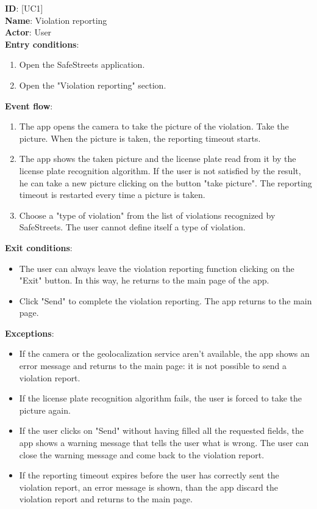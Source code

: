 \documentclass{article}
\newcommand\usecase[1]{ [UC#1] }
\begin{document}
				\textbf{ID}: \usecase{1} \\
				\textbf{Name}:   Violation reporting\\
				\textbf{Actor}:  User\\
				\textbf{Entry conditions}:
				\begin{enumerate}
					\item Open the SafeStreets application.
					\item Open the "Violation reporting" section.
				\end{enumerate}
				\textbf{Event flow}:
				\begin{enumerate}
					\item The app opens the camera to take the picture of the violation. Take the picture. When the picture is taken, the reporting timeout starts.
					\item The app shows the taken picture and the license plate read from it by the license plate recognition algorithm. If the user is not satisfied by the result, he can take a new picture clicking on the button "take picture". The reporting timeout is restarted every time a picture is taken.
					\item Choose a "type of violation" from the list of violations recognized by SafeStreets. The user cannot define itself a type of violation.
				\end{enumerate}
				\textbf{Exit conditions}:
				\begin{itemize}
					\item The user can always leave the violation reporting function clicking on the "Exit" button. In this way, he returns to the main page of the app.
					\item Click "Send" to complete the violation reporting. The app returns to the main page.
				\end{itemize}
				\textbf{Exceptions}:
				\begin{itemize}
					\item If the camera or the geolocalization service aren't available, the app shows an error message and returns to the main page: it is not possible to send a violation report.
					\item If the license plate recognition algorithm fails, the user is forced to take the picture again.
					\item If the user clicks on "Send" without having filled all the requested fields, the app shows a warning message that tells the user what is wrong. The user can close the warning message and come back to the violation report. 
					\item If the reporting timeout expires before the user has correctly sent the violation report, an error message is shown, than the app discard the violation report and returns to the main page.\\
				\end{itemize}
			
\end{document}
